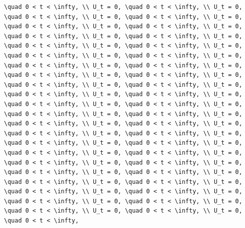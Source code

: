 \documentclass[
  ukrainian,
]{article}
\begin{document}
\begin{verbatim}
\quad 0 < t < \infty, \\ U_t = 0, \quad 0 < t < \infty, \\ U_t = 0, \quad 0 < t < \infty, \\ U_t = 0, \quad 0 < t < \infty, \\ U_t = 0, \quad 0 < t < \infty, \\ U_t = 0, \quad 0 < t < \infty, \\ U_t = 0, \quad 0 < t < \infty, \\ U_t = 0, \quad 0 < t < \infty, \\ U_t = 0, \quad 0 < t < \infty, \\ U_t = 0, \quad 0 < t < \infty, \\ U_t = 0, \quad 0 < t < \infty, \\ U_t = 0, \quad 0 < t < \infty, \\ U_t = 0, \quad 0 < t < \infty, \\ U_t = 0, \quad 0 < t < \infty, \\ U_t = 0, \quad 0 < t < \infty, \\ U_t = 0, \quad 0 < t < \infty, \\ U_t = 0, \quad 0 < t < \infty, \\ U_t = 0, \quad 0 < t < \infty, \\ U_t = 0, \quad 0 < t < \infty, \\ U_t = 0, \quad 0 < t < \infty, \\ U_t = 0, \quad 0 < t < \infty, \\ U_t = 0, \quad 0 < t < \infty, \\ U_t = 0, \quad 0 < t < \infty, \\ U_t = 0, \quad 0 < t < \infty, \\ U_t = 0, \quad 0 < t < \infty, \\ U_t = 0, \quad 0 < t < \infty, \\ U_t = 0, \quad 0 < t < \infty, \\ U_t = 0, \quad 0 < t < \infty, \\ U_t = 0, \quad 0 < t < \infty, \\ U_t = 0, \quad 0 < t < \infty, \\ U_t = 0, \quad 0 < t < \infty, \\ U_t = 0, \quad 0 < t < \infty, \\ U_t = 0, \quad 0 < t < \infty, \\ U_t = 0, \quad 0 < t < \infty, \\ U_t = 0, \quad 0 < t < \infty, \\ U_t = 0, \quad 0 < t < \infty, \\ U_t = 0, \quad 0 < t < \infty, \\ U_t = 0, \quad 0 < t < \infty, \\ U_t = 0, \quad 0 < t < \infty, \\ U_t = 0, \quad 0 < t < \infty, \\ U_t = 0, \quad 0 < t < \infty, \\ U_t = 0, \quad 0 < t < \infty, \\ U_t = 0, \quad 0 < t < \infty, \\ U_t = 0, \quad 0 < t < \infty, \\ U_t = 0, \quad 0 < t < \infty, 
\end{verbatim}
\end{document}
